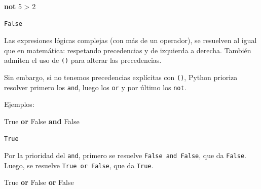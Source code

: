 \documentclass[
  letterpaper,
  DIV=11,
  numbers=noendperiod]{scrreprt}
\newenvironment{Shaded}{\begin{snugshade}}{\end{snugshade}}
\newcommand{\DecValTok}[1]{\textcolor[rgb]{0.68,0.00,0.00}{#1}}
\newcommand{\KeywordTok}[1]{\textcolor[rgb]{0.00,0.23,0.31}{\textbf{#1}}}
\newcommand{\OperatorTok}[1]{\textcolor[rgb]{0.37,0.37,0.37}{#1}}
\newcommand{\VariableTok}[1]{\textcolor[rgb]{0.07,0.07,0.07}{#1}}
\begin{document}
\begin{Shaded}
\begin{Highlighting}[]
\KeywordTok{not} \DecValTok{5} \OperatorTok{\textgreater{}} \DecValTok{2}
\end{Highlighting}
\end{Shaded}

\begin{verbatim}
False
\end{verbatim}

\begin{tcolorbox}[enhanced jigsaw, opacitybacktitle=0.6, toptitle=1mm, toprule=.15mm, arc=.35mm, breakable, bottomrule=.15mm, opacityback=0, leftrule=.75mm, rightrule=.15mm, title=\textcolor{quarto-callout-caution-color}{\faFire}\hspace{0.5em}{Prioridad de Operadores}, left=2mm, bottomtitle=1mm, colframe=quarto-callout-caution-color-frame, colback=white, titlerule=0mm, coltitle=black, colbacktitle=quarto-callout-caution-color!10!white]

Las expresiones lógicas complejas (con más de un operador), se resuelven
al igual que en matemática: respetando precedencias y de izquierda a
derecha. También admiten el uso de \texttt{()} para alterar las
precedencias.

Sin embargo, si no tenemos precedencias explícitas con \texttt{()},
Python prioriza resolver primero los \texttt{and}, luego los \texttt{or}
y por último los \texttt{not}.

Ejemplos:

\begin{Shaded}
\begin{Highlighting}[]
\VariableTok{True} \KeywordTok{or} \VariableTok{False} \KeywordTok{and} \VariableTok{False}
\end{Highlighting}
\end{Shaded}

\begin{verbatim}
True
\end{verbatim}

Por la prioridad del \texttt{and}, primero se resuelve
\texttt{False\ and\ False}, que da \texttt{False}. Luego, se resuelve
\texttt{True\ or\ False}, que da \texttt{True}.

\begin{Shaded}
\begin{Highlighting}[]
\VariableTok{True} \KeywordTok{or} \VariableTok{False} \KeywordTok{or} \VariableTok{False}
\end{Highlighting}
\end{Shaded}


\end{tcolorbox}
\end{document}
